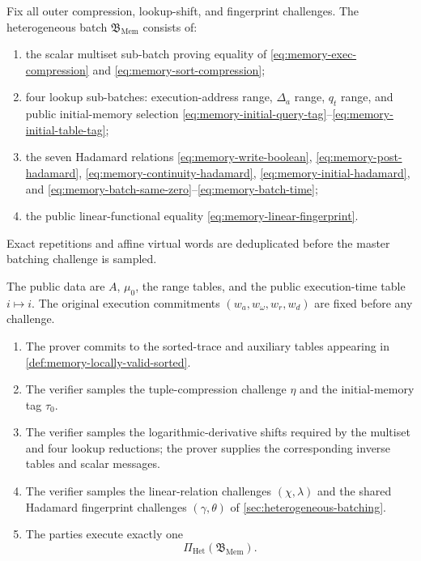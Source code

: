\begin{definition}
\label{def:memory-sub-batch}
Fix all outer compression, lookup-shift, and fingerprint challenges.  The heterogeneous batch $\mathfrak B_{\mathrm{Mem}}$ consists of:
\begin{enumerate}[label=(\roman*),leftmargin=*]
  \item the scalar multiset sub-batch proving equality of \eqref{eq:memory-exec-compression} and \eqref{eq:memory-sort-compression};
  \item four lookup sub-batches: execution-address range, $\Delta_a$ range, $q_t$ range, and public initial-memory selection \eqref{eq:memory-initial-query-tag}--\eqref{eq:memory-initial-table-tag};
  \item the seven Hadamard relations \eqref{eq:memory-write-boolean}, \eqref{eq:memory-post-hadamard}, \eqref{eq:memory-continuity-hadamard}, \eqref{eq:memory-initial-hadamard}, and \eqref{eq:memory-batch-same-zero}--\eqref{eq:memory-batch-time};
  \item the public linear-functional equality \eqref{eq:memory-linear-fingerprint}.
\end{enumerate}
Exact repetitions and affine virtual words are deduplicated before the master batching challenge is sampled.
\end{definition}

\begin{definition}
\label{def:memory-protocol}
The public data are $A$, $\mu_0$, the range tables, and the public execution-time table $i\mapsto i$.  The original execution commitments $(w_a,w_\omega,w_r,w_d)$ are fixed before any challenge.
\begin{enumerate}[label=\textnormal{\arabic*.},leftmargin=*]
  \item The prover commits to the sorted-trace and auxiliary tables appearing in \cref{def:memory-locally-valid-sorted}.
  \item The verifier samples the tuple-compression challenge $\eta$ and the initial-memory tag $\tau_0$.
  \item The verifier samples the logarithmic-derivative shifts required by the multiset and four lookup reductions; the prover supplies the corresponding inverse tables and scalar messages.
  \item The verifier samples the linear-relation challenges $(\chi,\lambda)$ and the shared Hadamard fingerprint challenges $(\gamma,\theta)$ of \cref{sec:heterogeneous-batching}.
  \item The parties execute exactly one
  \begin{equation}
    \Pi_{\mathrm{Het}}(\mathfrak B_{\mathrm{Mem}}).
    \label{eq:memory-one-folding-batch}
  \end{equation}
\end{enumerate}
\end{definition}

